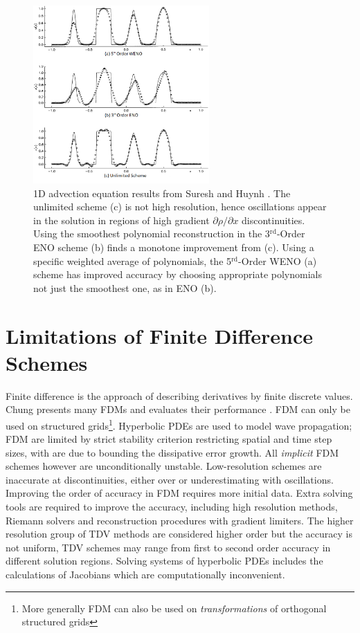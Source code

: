 	\begin{figure}
    		\centering
        		\includegraphics[trim=0 0 0 0,clip,width=0.6\textwidth]{high_res.png}
		\caption[Approach : Comparison of high resolution schemes]{1D advection equation results from Suresh and Huynh \cite{Suresh97}. The unlimited scheme (c) is not high resolution, hence oscillations appear in the solution in regions of high gradient $\partial \rho/\partial x$ discontinuities. Using the smoothest polynomial reconstruction in the 3$^{\mathrm{rd}}$-Order ENO scheme (b) finds a monotone improvement from (c). Using a specific weighted average of polynomials, the 5$^{\mathrm{rd}}$-Order WENO (a) scheme has improved accuracy by choosing appropriate polynomials not just the smoothest one, as in ENO (b). }
		\label{fig:high_res_schemes}
	\end{figure}
	
\newpage
\section{Limitations of Finite Difference Schemes}

	Finite difference is the approach of describing derivatives by finite discrete values. Chung presents many FDMs and evaluates their performance \cite{Chung02}. FDM can only be used on structured grids\footnote{More generally FDM can also be used on \emph{transformations} of orthogonal structured grids}. Hyperbolic PDEs are used to model wave propagation; FDM are limited by strict stability criterion restricting spatial and time step sizes, with are due to bounding the dissipative error growth. All \emph{implicit} FDM schemes however are unconditionally unstable. Low-resolution schemes are inaccurate at discontinuities, either over or underestimating with oscillations. Improving the order of accuracy in FDM requires more initial data. Extra solving tools are required to improve the accuracy, including high resolution methods, Riemann solvers and reconstruction procedures with gradient limiters. The higher resolution group of TDV methods are considered higher order but the accuracy is not uniform, TDV schemes may range from first to second order accuracy in different solution regions. Solving systems of hyperbolic PDEs includes the calculations of Jacobians which are computationally inconvenient. 
	
